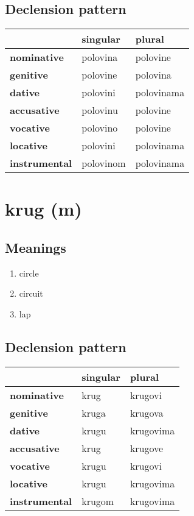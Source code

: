 \subsection*{Declension pattern}
\begin{tabularx}{\linewidth}{Xll}
\toprule
{} &   singular &      plural \\
\midrule
\textbf{nominative  } &   polovina &    polovine \\
\textbf{genitive    } &   polovine &    polovina \\
\textbf{dative      } &   polovini &  polovinama \\
\textbf{accusative  } &   polovinu &    polovine \\
\textbf{vocative    } &   polovino &    polovine \\
\textbf{locative    } &   polovini &  polovinama \\
\textbf{instrumental} &  polovinom &  polovinama \\
\bottomrule
\end{tabularx}

\filbreak
\section{krug (m)}
\subsection*{Meanings}
\begin{enumerate}
\item circle
\item circuit
\item lap
\end{enumerate}
\subsection*{Declension pattern}
\begin{tabularx}{\linewidth}{Xll}
\toprule
{} & singular &     plural \\
\midrule
\textbf{nominative  } &     krug &    krugovi \\
\textbf{genitive    } &    kruga &    krugova \\
\textbf{dative      } &    krugu &  krugovima \\
\textbf{accusative  } &     krug &    krugove \\
\textbf{vocative    } &    krugu &    krugovi \\
\textbf{locative    } &    krugu &  krugovima \\
\textbf{instrumental} &   krugom &  krugovima \\
\bottomrule
\end{tabularx}

